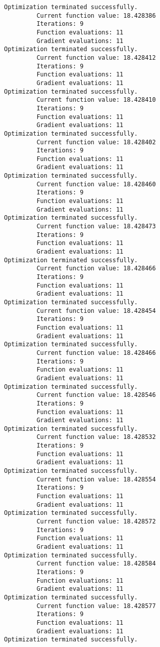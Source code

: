 \documentclass[11pt]{article}
\begin{document}
\begin{Verbatim}[commandchars=\\\{\}]
Optimization terminated successfully.
         Current function value: 18.428386
         Iterations: 9
         Function evaluations: 11
         Gradient evaluations: 11
Optimization terminated successfully.
         Current function value: 18.428412
         Iterations: 9
         Function evaluations: 11
         Gradient evaluations: 11
Optimization terminated successfully.
         Current function value: 18.428410
         Iterations: 9
         Function evaluations: 11
         Gradient evaluations: 11
Optimization terminated successfully.
         Current function value: 18.428402
         Iterations: 9
         Function evaluations: 11
         Gradient evaluations: 11
Optimization terminated successfully.
         Current function value: 18.428460
         Iterations: 9
         Function evaluations: 11
         Gradient evaluations: 11
Optimization terminated successfully.
         Current function value: 18.428473
         Iterations: 9
         Function evaluations: 11
         Gradient evaluations: 11
Optimization terminated successfully.
         Current function value: 18.428466
         Iterations: 9
         Function evaluations: 11
         Gradient evaluations: 11
Optimization terminated successfully.
         Current function value: 18.428454
         Iterations: 9
         Function evaluations: 11
         Gradient evaluations: 11
Optimization terminated successfully.
         Current function value: 18.428466
         Iterations: 9
         Function evaluations: 11
         Gradient evaluations: 11
Optimization terminated successfully.
         Current function value: 18.428546
         Iterations: 9
         Function evaluations: 11
         Gradient evaluations: 11
Optimization terminated successfully.
         Current function value: 18.428532
         Iterations: 9
         Function evaluations: 11
         Gradient evaluations: 11
Optimization terminated successfully.
         Current function value: 18.428554
         Iterations: 9
         Function evaluations: 11
         Gradient evaluations: 11
Optimization terminated successfully.
         Current function value: 18.428572
         Iterations: 9
         Function evaluations: 11
         Gradient evaluations: 11
Optimization terminated successfully.
         Current function value: 18.428584
         Iterations: 9
         Function evaluations: 11
         Gradient evaluations: 11
Optimization terminated successfully.
         Current function value: 18.428577
         Iterations: 9
         Function evaluations: 11
         Gradient evaluations: 11
Optimization terminated successfully.

\end{Verbatim}
\end{document}
